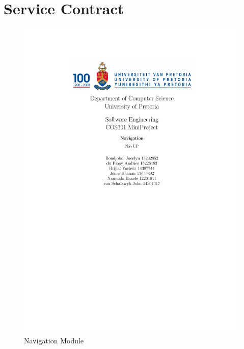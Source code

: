 \documentclass[a4paper,10pt]{article}
\begin{document}
\section{Service Contract}
		\begin{figure}
		\includegraphics[scale=0.4]{Service_Contract}
		\caption{Navigation Module}
		\end{figure}

\newpage
\clearpage
\end{document}
